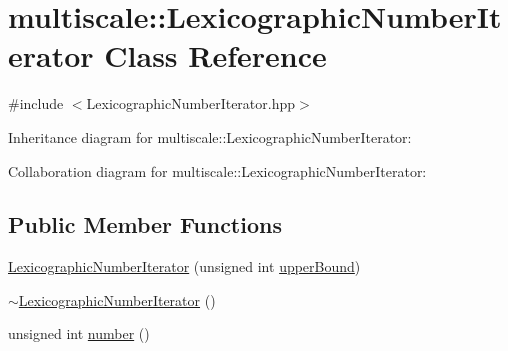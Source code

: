 \hypertarget{classmultiscale_1_1LexicographicNumberIterator}{\section{multiscale\-:\-:Lexicographic\-Number\-Iterator Class Reference}
\label{classmultiscale_1_1LexicographicNumberIterator}
}


{\ttfamily \#include $<$Lexicographic\-Number\-Iterator.\-hpp$>$}



Inheritance diagram for multiscale\-:\-:Lexicographic\-Number\-Iterator\-:


Collaboration diagram for multiscale\-:\-:Lexicographic\-Number\-Iterator\-:
\subsection*{Public Member Functions}
\begin{DoxyCompactItemize}
\item 
\hyperlink{classmultiscale_1_1LexicographicNumberIterator_a02a95a6f7876b84909e08555730ff08a}{Lexicographic\-Number\-Iterator} (unsigned int \hyperlink{classmultiscale_1_1NumberIterator_a56a5558958778bbde64e249d67cba886}{upper\-Bound})
\item 
\hyperlink{classmultiscale_1_1LexicographicNumberIterator_affe04d9733b7d0984a5ab3957cb0096a}{$\sim$\-Lexicographic\-Number\-Iterator} ()
\item 
unsigned int \hyperlink{classmultiscale_1_1LexicographicNumberIterator_a282d970d0d1a33d2736bbdf104c18336}{number} ()
\end{DoxyCompactItemize}
